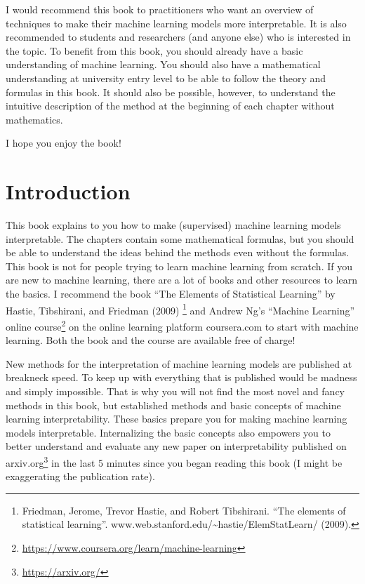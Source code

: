 \documentclass[
  11pt,
]{scrbook}
\renewcommand{\href}[2]{#2\footnote{\url{#1}}}
\begin{document}
I would recommend this book to practitioners who want an overview of techniques to make their machine learning models more interpretable.
It is also recommended to students and researchers (and anyone else) who is interested in the topic.
To benefit from this book, you should already have a basic understanding of machine learning.
You should also have a mathematical understanding at university entry level to be able to follow the theory and formulas in this book.
It should also be possible, however, to understand the intuitive description of the method at the beginning of each chapter without mathematics.

I hope you enjoy the book!

\mainmatter

\hypertarget{intro}{%
\chapter{Introduction}\label{intro}}

This book explains to you how to make (supervised) machine learning models interpretable.
The chapters contain some mathematical formulas, but you should be able to understand the ideas behind the methods even without the formulas.
This book is not for people trying to learn machine learning from scratch.
If you are new to machine learning, there are a lot of books and other resources to learn the basics.
I recommend the book ``The Elements of Statistical Learning'' by Hastie, Tibshirani, and Friedman (2009) \footnote{Friedman, Jerome, Trevor Hastie, and Robert Tibshirani. ``The elements of statistical learning''. www.web.stanford.edu/\textasciitilde hastie/ElemStatLearn/ (2009).} and \href{https://www.coursera.org/learn/machine-learning}{Andrew Ng's ``Machine Learning'' online course} on the online learning platform coursera.com to start with machine learning.
Both the book and the course are available free of charge!

New methods for the interpretation of machine learning models are published at breakneck speed.
To keep up with everything that is published would be madness and simply impossible.
That is why you will not find the most novel and fancy methods in this book, but established methods and basic concepts of machine learning interpretability.
These basics prepare you for making machine learning models interpretable.
Internalizing the basic concepts also empowers you to better understand and evaluate any new paper on interpretability published on \href{https://arxiv.org/}{arxiv.org} in the last 5 minutes since you began reading this book (I might be exaggerating the publication rate).
\end{document}
